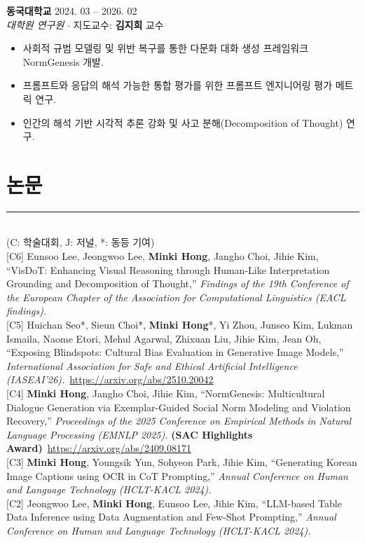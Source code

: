 \documentclass[10pt,a4paper]{article}
\newcommand{\sectionrule}{\vspace{-0.5em}\rule{\textwidth}{0.4pt}\\[0.2em]}
\newcommand{\cvheader}[1]{{\normalsize\bfseries #1}}
\newcommand{\cvposition}[1]{{\itshape #1}}
\newcommand{\cvdate}[1]{\hfill #1}
\begin{document}
\vspace{1pt}
\cvheader{동국대학교} \cvdate{2024. 03 -- 2026. 02}\\
\cvposition{대학원 연구원} $\cdot$ 지도교수: \textbf{김지희} 교수
\begin{itemize}
    \item 사회적 규범 모델링 및 위반 복구를 통한 다문화 대화 생성 프레임워크 NormGenesis 개발.
    \item 프롬프트와 응답의 해석 가능한 통합 평가를 위한 프롬프트 엔지니어링 평가 메트릭 연구.
    \item 인간의 해석 기반 시각적 추론 강화 및 사고 분해(Decomposition of Thought) 연구.
\end{itemize}

\section{논문}
\sectionrule
(C: 학술대회, J: 저널, *: 동등 기여)\\[4pt]
[C6] Eunsoo Lee, Jeongwoo Lee, \textbf{Minki Hong}, Jangho Choi, Jihie Kim, ``VisDoT: Enhancing Visual Reasoning through Human-Like Interpretation Grounding and Decomposition of Thought,'' \textit{Findings of the 19th Conference of the European Chapter of the Association for Computational Linguistics (EACL findings).}\\[2pt]
[C5] Huichan Seo*, Sieun Choi*, \textbf{Minki Hong}*, Yi Zhou, Junseo Kim, Lukman Ismaila, Naome Etori, Mehul Agarwal, Zhixuan Liu, Jihie Kim, Jean Oh, ``Exposing Blindspots: Cultural Bias Evaluation in Generative Image Models,'' \textit{International Association for Safe and Ethical Artificial Intelligence (IASEAI'26).}~\url{https://arxiv.org/abs/2510.20042}\\[2pt]
[C4] \textbf{Minki Hong}, Jangho Choi, Jihie Kim, ``NormGenesis: Multicultural Dialogue Generation via Exemplar-Guided Social Norm Modeling and Violation Recovery,'' \textit{Proceedings of the 2025 Conference on Empirical Methods in Natural Language Processing (EMNLP 2025).} \textbf{(SAC Highlights Award)}~\url{https://arxiv.org/abs/2409.08171}\\[2pt]
[C3] \textbf{Minki Hong}, Youngsik Yun, Sohyeon Park, Jihie Kim, ``Generating Korean Image Captions using OCR in CoT Prompting,'' \textit{Annual Conference on Human and Language Technology (HCLT-KACL 2024).}\\[2pt]
[C2] Jeongwoo Lee, \textbf{Minki Hong}, Eunsoo Lee, Jihie Kim, ``LLM-based Table Data Inference using Data Augmentation and Few-Shot Prompting,'' \textit{Annual Conference on Human and Language Technology (HCLT-KACL 2024).}\\[2pt]
\end{document}
